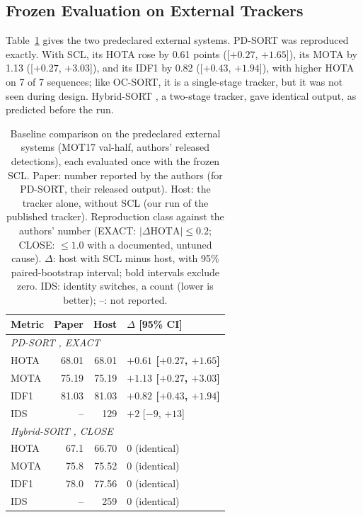 \subsection{Frozen Evaluation on External Trackers}\label{sec:res-scl-external}
Table~\ref{tab:res-scl-external} gives the two predeclared external systems. PD-SORT \cite{wang2025pdsort} was reproduced exactly. With SCL, its HOTA rose by 0.61 points ([$+0.27$, $+1.65$]), its MOTA by 1.13 ([$+0.27$, $+3.03$]), and its IDF1 by 0.82 ([$+0.43$, $+1.94$]), with higher HOTA on 7 of 7 sequences; like OC-SORT, it is a single-stage tracker, but it was not seen during design. Hybrid-SORT \cite{yang2024hybridsort}, a two-stage tracker, gave identical output, as predicted before the run.

\begin{table}[tbp]
\centering
\caption{Baseline comparison on the predeclared external systems (MOT17 val-half, authors' released detections), each evaluated once with the frozen SCL. Paper: number reported by the authors (for PD-SORT, their released output). Host: the tracker alone, without SCL (our run of the published tracker). Reproduction class against the authors' number (EXACT: $|\Delta\mathrm{HOTA}|\le0.2$; CLOSE: $\le1.0$ with a documented, untuned cause). $\Delta$: host with SCL minus host, with 95\% paired-bootstrap interval; bold intervals exclude zero. IDS: identity switches, a count (lower is better); --: not reported.}
\label{tab:res-scl-external}
\begin{tabular}{lrrl}
\toprule
Metric & Paper & Host & $\Delta$ [95\% CI]\\
\midrule
\multicolumn{4}{l}{\textit{PD-SORT} \cite{wang2025pdsort}\textit{, EXACT}}\\
\quad HOTA & 68.01 & 68.01 & \textbf{$+0.61$ [$+0.27$, $+1.65$]}\\
\quad MOTA & 75.19 & 75.19 & \textbf{$+1.13$ [$+0.27$, $+3.03$]}\\
\quad IDF1 & 81.03 & 81.03 & \textbf{$+0.82$ [$+0.43$, $+1.94$]}\\
\quad IDS & -- & 129 & $+2$ [$-9$, $+13$]\\
\multicolumn{4}{l}{\textit{Hybrid-SORT} \cite{yang2024hybridsort}\textit{, CLOSE}}\\
\quad HOTA & 67.1 & 66.70 & 0 (identical)\\
\quad MOTA & 75.8 & 75.52 & 0 (identical)\\
\quad IDF1 & 78.0 & 77.56 & 0 (identical)\\
\quad IDS & -- & 259 & 0 (identical)\\
\bottomrule
\end{tabular}
\end{table}

